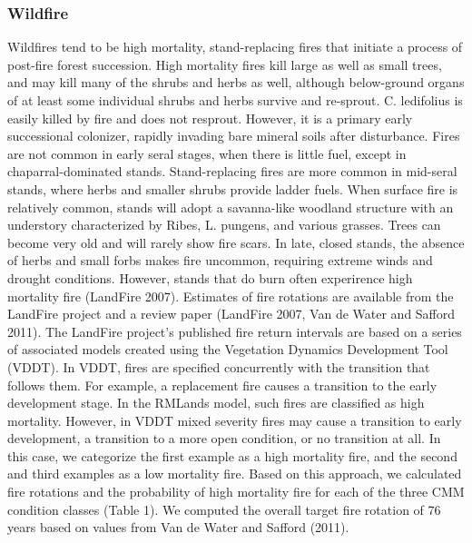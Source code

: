\subsubsection{Wildfire}
Wildfires tend to be high mortality, stand-replacing fires that initiate a process of post-fire forest succession. High mortality fires kill large as well as small trees, and may kill many of the shrubs and herbs as well, although below-ground organs of at least some individual shrubs and herbs survive and re-sprout. 
	C. ledifolius is easily killed by fire and does not resprout. However, it is a primary early successional colonizer, rapidly invading bare mineral soils after disturbance. Fires are not common in early seral stages, when there is little fuel, except in chaparral-dominated stands. Stand-replacing fires are more common in mid-seral stands, where herbs and smaller shrubs provide ladder fuels. When surface fire is relatively common, stands will adopt a savanna-like woodland structure with an understory characterized by Ribes, L. pungens, and various grasses. Trees can become very old and will rarely show fire scars. In late, closed stands, the absence of herbs and small forbs makes fire uncommon, requiring extreme winds and drought conditions. However, stands that do burn often experirence high mortality fire (LandFire 2007).
Estimates of fire rotations are available from the LandFire project and a review paper (LandFire 2007, Van de Water and Safford 2011). The LandFire project’s published fire return intervals are based on a series of associated models created using the Vegetation Dynamics Development Tool (VDDT). In VDDT, fires are specified concurrently with the transition that follows them. For example, a replacement fire causes a transition to the early development stage. In the RMLands model, such fires are classified as high mortality. However, in VDDT mixed severity fires may cause a transition to early development, a transition to a more open condition, or no transition at all. In this case, we categorize the first example as a high mortality fire, and the second and third examples as a low mortality fire. Based on this approach, we calculated fire rotations and the probability of high mortality fire for each of the three CMM condition classes (Table 1). We computed the overall target fire rotation of 76 years based on values from Van de Water and Safford (2011). 




